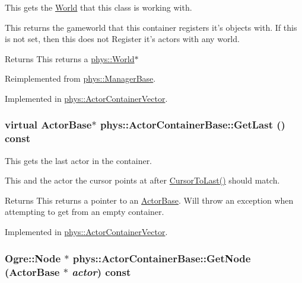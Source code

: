 This gets the \hyperlink{classphys_1_1World}{World} that this class is working with. 

This returns the gameworld that this container registers it's objects with. If this is not set, then this does not Register it's actors with any world. \begin{DoxyReturn}{Returns}
This returns a \hyperlink{classphys_1_1World}{phys::World}$\ast$ 
\end{DoxyReturn}


Reimplemented from \hyperlink{classphys_1_1ManagerBase_addfd62fbc444ca4c2aba40768d1b284e}{phys::ManagerBase}.



Implemented in \hyperlink{classphys_1_1ActorContainerVector_a5519eb0000073a2f397e158bfc368349}{phys::ActorContainerVector}.

\hypertarget{classphys_1_1ActorContainerBase_a8efeffd5ae22085fe01af791b3ea559e}{
\subsubsection[{GetLast}]{\setlength{\rightskip}{0pt plus 5cm}virtual {\bf ActorBase}$\ast$ phys::ActorContainerBase::GetLast () const}}
\label{d1/d00/classphys_1_1ActorContainerBase_a8efeffd5ae22085fe01af791b3ea559e}


This gets the last actor in the container. 

This and the actor the cursor points at after \hyperlink{classphys_1_1ActorContainerBase_afad072e018a04c190e5e5fb93b82b354}{CursorToLast()} should match. \begin{DoxyReturn}{Returns}
This returns a pointer to an \hyperlink{classphys_1_1ActorBase}{ActorBase}. Will throw an exception when attempting to get from an empty container. 
\end{DoxyReturn}


Implemented in \hyperlink{classphys_1_1ActorContainerVector_a211f6e419ef0b753cecf2c662a54511e}{phys::ActorContainerVector}.

\hypertarget{classphys_1_1ActorContainerBase_a9813fe23051cc1a324bfedd4d35d27ad}{
\subsubsection[{GetNode}]{\setlength{\rightskip}{0pt plus 5cm}Ogre::Node $\ast$ phys::ActorContainerBase::GetNode ({\bf ActorBase} $\ast$ {\em actor}) const}}
\label{d1/d00/classphys_1_1ActorContainerBase_a9813fe23051cc1a324bfedd4d35d27ad}


